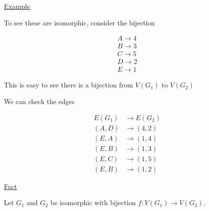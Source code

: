 \documentclass{article}
\begin{document}
\underline{Example}

\begin{center}
\end{center}

To see these are isomorphic, consider the bijection

\begin{align*}
    A \longrightarrow 4 \\
    B \longrightarrow 3 \\
    C \longrightarrow 5 \\
    D \longrightarrow 2 \\ 
    E \longrightarrow 1
\end{align*}


This is easy to see there is a bijection from $V(G_1)$ to $V(G_2)$


We can check the edges

\begin{align*}
    E(G_1) &\longrightarrow E(G_2) \\
    (A,D) &\longrightarrow (4,2) \\
    (E,A) &\longrightarrow (1,4) \\
    (E,B) &\longrightarrow (1,3) \\
    (E,C) &\longrightarrow (1,5) \\
    (E,B) &\longrightarrow (1,2)
\end{align*}


\underline{Fact}

Let $G_1$ and $G_2$ be isomorphic with bijection $f: V(G_1) \to V(G_2)$.
\end{document}
